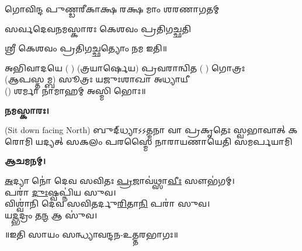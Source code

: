 {𑌗𑍋𑌵𑌿𑌨𑍍𑌦 𑌪𑍁𑌣𑍍𑌡𑌰𑍀𑌕𑌾𑌕𑍍𑌷 𑌰𑌕𑍍𑌷 𑌮𑌾𑌂 𑌶𑌰𑌣𑌾𑌗𑌤𑌮𑍍}

{𑌸𑌰𑍍𑌵𑌦𑍇𑌵𑌨𑌮𑌸𑍍𑌕𑌾𑌰𑌃 𑌕𑍇𑌶𑌵𑌂 𑌪𑍍𑌰𑌤𑌿𑌗𑌚𑍍𑌛𑌤𑌿}

𑌶𑍍𑌰𑍀 𑌕𑍇𑌶𑌵𑌂 𑌪𑍍𑌰𑌤𑌿𑌗𑌚𑍍𑌛𑌤𑍍𑌯𑍋𑌂 𑌨𑌮 𑌇𑌤𑌿॥

𑌅𑌭𑌿𑌵𑌾𑌦𑌯𑍇 ( ) (𑌤𑍍𑌰𑌯𑌾𑌰𑍍𑌷𑍇𑌯) 𑌪𑍍𑌰𑌵𑌰𑌾𑌨𑍍𑌵𑌿𑌤 ( ) 𑌗𑍋𑌤𑍍𑌰𑌃\\
(𑌆𑌪𑌸𑍍𑌤𑌮𑍍𑌬) 𑌸𑍂𑌤𑍍𑌰𑌃 𑌯𑌜𑍁𑌃𑌶𑌾𑌖𑌾 𑌅𑌧𑍍𑌯𑌾𑌯𑍀\\
() 𑌶𑌰𑍍𑌮𑌾 𑌨𑌾𑌮𑌾𑌹𑌮𑍍 𑌅𑌸𑍍𑌮𑌿 𑌭𑍋𑌃॥

\textbf{𑌨𑌮𑌸𑍍𑌕𑌾𑌰𑌃।}


{\scriptsize (Sit down facing North)}
{𑌬𑍁𑌦𑍍‌𑌧𑍍𑌯𑌾𑌽𑌽𑌤𑍍𑌮𑌨𑌾 𑌵𑌾 𑌪𑍍𑌰𑌕𑍃𑌤𑍇𑌃 𑌸𑍍𑌵𑌭𑌾𑌵𑌾𑌤𑍍}
{𑌕𑌰𑍋𑌮𑌿 𑌯𑌦𑍍𑌯𑌤𑍍 𑌸𑌕𑌲𑌂 𑌪𑌰𑌸𑍍𑌮𑍈}
{𑌨𑌾𑌰𑌾𑌯𑌣𑌾𑌯𑍇𑌤𑌿 𑌸𑌮𑌰𑍍𑌪𑌯𑌾𑌮𑌿}

\textbf{𑌆𑌚𑌮𑌨𑌮𑍍।}


\ul{𑌅}𑌦𑍍𑌯𑌾 𑌨𑍋॑ 𑌦𑍇𑌵 𑌸𑌵𑌿𑌤𑌃 \ul{𑌪𑍍𑌰}𑌜𑌾𑌵॑𑌥𑍍𑌸𑌾\ul{𑌵𑍀𑌃} 𑌸𑍗𑌭॑𑌗𑌮𑍍।\\
𑌪𑌰𑌾॑ \ul{𑌦𑍁𑌃}𑌷𑍍𑌵𑌪𑍍𑌨𑌿॑𑌯 𑌸𑍁𑌵।\\
𑌵𑌿𑌶𑍍𑌵𑌾॑𑌨𑌿 𑌦𑍇𑌵 𑌸𑌵𑌿𑌤𑌰𑍍𑌦𑍁\ul{𑌰𑌿}𑌤𑌾\ul{𑌨𑌿} 𑌪𑌰𑌾॑ 𑌸𑍁𑌵।\\
𑌯\ul{𑌦𑍍𑌭}𑌦𑍍𑌰𑌂 𑌤\ul{𑌨𑍍𑌮} 𑌆 𑌸𑍁॑𑌵।

\centerline{॥𑌇𑌤𑌿 𑌸𑌾𑌯𑌂 𑌸𑌨𑍍𑌧𑍍𑌯𑌾𑌵𑌨𑍍𑌦𑌨-𑌉𑌤𑍍𑌤𑌰𑌭𑌾𑌗𑌃॥}
 

















